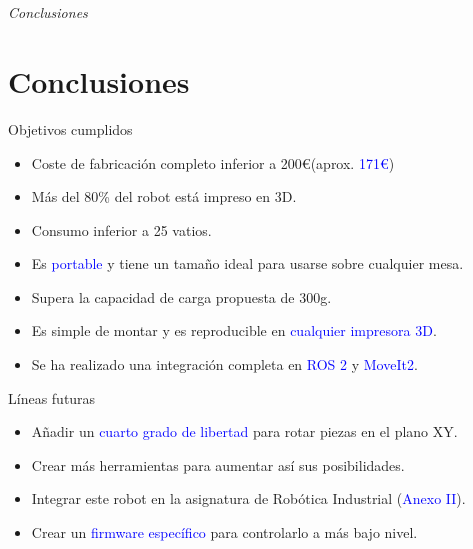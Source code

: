 \documentclass{beamer}
\begin{document}
\section*{}
\begin{frame}{}
  \centering \Huge
  \emph{Conclusiones}
\end{frame}

\section{Conclusiones}

\begin{frame}
\begin{block}{Objetivos cumplidos}
\begin{itemize}
\item Coste de fabricación completo inferior a 200\euro\xspace(aprox. \textcolor{blue}{171\euro})
\item Más del 80\% del robot está impreso en 3D.
\item Consumo inferior a 25 vatios.
\item Es \textcolor{blue}{portable} y tiene un tamaño ideal para usarse sobre cualquier mesa.
\item Supera la capacidad de carga propuesta de 300g.
\item Es simple de montar y es reproducible en \textcolor{blue}{cualquier impresora 3D}.
\item Se ha realizado una integración completa en \textcolor{blue}{ROS 2} y \textcolor{blue}{MoveIt2}.
\end{itemize}
\end{block}
\end{frame}

\begin{frame}
\begin{block}{Líneas futuras}
  \begin{itemize}
  \item Añadir un \textcolor{blue}{cuarto grado de libertad} para rotar piezas en el plano XY.
  \item Crear más herramientas para aumentar así sus posibilidades.
  \item Integrar este robot en la asignatura de Robótica Industrial (\textcolor{blue}{Anexo II}).
  \item Crear un \textcolor{blue}{firmware específico} para controlarlo a más bajo nivel.
  \end{itemize}
  \end{block}
\end{frame}

\begin{frame}[plain]
\large{\titlepage}
\end{frame}
\end{document}
